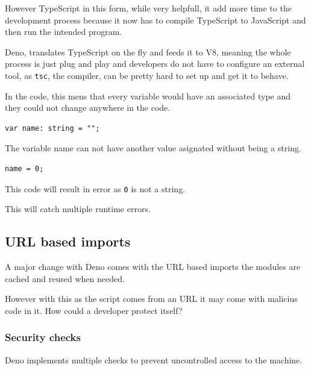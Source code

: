 \documentclass[12pt, letterpaper]{article}
\begin{document}
\begin{multicols}{2}
    However TypeScript in this form, while very helpfull, it add more time to the development process because it now has to compile TypeScript to JavaScript and then run the intended program.

    Deno, translates TypeScript on the fly and feeds it to V8, meaning the whole process is just plug and play and developers do not have to configure an external tool, as \verb|tsc|, the compiler, can be pretty hard to set up and get it to behave.

    In the code, this mens that every variable would have an associated type and they could not change anywhere in the code.

    \begin{lstlisting}
var name: string = "";
    \end{lstlisting}

    The variable name can not have another value asignated without being a string.

    \begin{lstlisting}
name = 0;
    \end{lstlisting}

    This code will result in error as \verb|0| is not a string.

    This will catch multiple runtime errors.

    \subsection{URL based imports}

    A major change with Deno comes with the URL based imports the modules are cached and reused when needed.

    However with this as the script comes from an URL it may come with malicius code in it. How could a developer protect itself?

    \subsubsection{Security checks}

    Deno implements multiple checks to prevent uncontrolled access to the machine.


\end{multicols}
\end{document}
